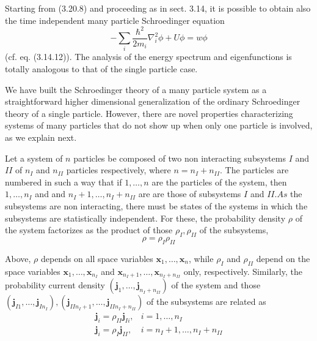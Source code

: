 \documentclass{article}
\begin{document}
Starting from (3.20.8) and proceeding as in sect. 3.14, it is possible to obtain also the time independent many particle Schroedinger equation
$$
\begin{equation*}
-\sum_{i} \frac{\hbar^{2}}{2 m_{i}} \nabla_{i}^{2} \phi+U \phi=w \phi \tag{3.20.21}
\end{equation*}
$$
(cf. eq. (3.14.12)). The analysis of the energy spectrum and eigenfunctions is totally analogous to that of the single particle case.

We have built the Schroedinger theory of a many particle system as a straightforward higher dimensional generalization of the ordinary Schroedinger theory of a single particle. However, there are novel properties characterizing systems of many particles that do not show up when only one particle is involved, as we explain next.

Let a system of $n$ particles be composed of two non interacting subsystems $I$ and $I I$ of $n_{I}$ and $n_{I I}$ particles respectively, where $n=n_{I}+n_{I I}$. The particles are numbered in such a way that if $1, \ldots, n$ are the particles of the system, then $1, \ldots, n_{I}$ and and $n_{I}+1, \ldots, n_{I}+n_{I I}$ are are those of subsystems $I$ and $I I . A s$ the subsystems are non interacting, there must be states of the systems in which the subsystems are statistically independent. For these, the probability density $\rho$ of the system factorizes as the product of those $\rho_{I}, \rho_{I I}$ of the subsystems,
$$
\begin{equation*}
\rho=\rho_{I} \rho_{I I} \tag{3.20.22}
\end{equation*}
$$

Above, $\rho$ depends on all space variables $\boldsymbol{x}_{1}, \ldots, \boldsymbol{x}_{n}$, while $\rho_{I}$ and $\rho_{I I}$ depend on the space variables $\boldsymbol{x}_{1}, \ldots, \boldsymbol{x}_{n_{I}}$ and $\boldsymbol{x}_{n_{I}+1}, \ldots, \boldsymbol{x}_{n_{I}+n_{I I}}$ only, respectively. Similarly, the probability current density $\left(\boldsymbol{j}_{1}, \ldots, \boldsymbol{j}_{n_{I}+n_{I I}}\right)$ of the system and those $\left(\boldsymbol{j}_{I 1}, \ldots, \boldsymbol{j}_{I n_{I}}\right),\left(\boldsymbol{j}_{I I n_{I}+1}, \ldots, \boldsymbol{j}_{I I n_{I}+n_{I I}}\right)$ of the subsystems are related as
$$
\begin{align*}
\boldsymbol{j}_{i}=\rho_{I I} \boldsymbol{j}_{I i}, & i=1, \ldots, n_{I}  \tag{3.20.23}\\
\boldsymbol{j}_{i}=\rho_{I} \boldsymbol{j}_{I I}, & i=n_{I}+1, \ldots, n_{I}+n_{I I}
\end{align*}
$$
\end{document}
